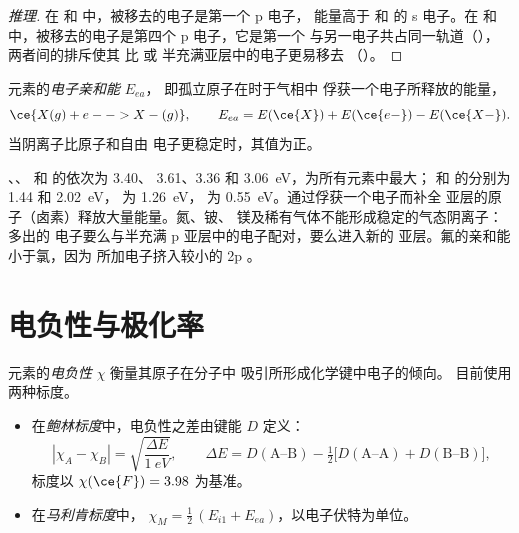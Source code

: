 \begin{proof}[推理]
在  和  中，被移去的电子是第一个 p 电子，
能量高于  和  的 s 电子。在 
和  中，被移去的电子是第四个 p 电子，它是第一个
与另一电子共占同一轨道（），两者间的排斥使其
比  或  半充满亚层中的电子更易移去
（）。
\end{proof}

\begin{definition}[电子亲和能]\label{def:b1:periodicity:electron-affinity}
元素的\emph{电子亲和能} $E_{ea}$，
即孤立原子在时于气相中
俘获一个电子所释放的能量，
\[
  \ce{X(g) + e- -> X-(g)}, \qquad E_{ea} = E(\ce{X}) + E(\ce{e-}) - E(\ce{X-}) .
\]
当阴离子比原子和自由
电子更稳定时，其值为正。
\end{definition}

\begin{example}[卤素及其近邻元素]\label{ex:b1:periodicity:ea}
、、 和  的依次为 3.40、
3.61、3.36 和 \qty{3.06}{eV}，为所有元素中最大； 和 
的分别为 1.44 和 \qty{2.02}{eV}， 为 \qty{1.26}{eV}，
 为 \qty{0.55}{eV}。通过俘获一个电子而补全
亚层的原子（卤素）释放大量能量。氮、铍、
镁及稀有气体不能形成稳定的气态阴离子：多出的
电子要么与半充满 p 亚层中的电子配对，要么进入新的
亚层。氟的亲和能小于氯，因为
所加电子挤入较小的 2p 。
\end{example}

\section{电负性与极化率}

\begin{definition}[电负性]\label{def:b1:periodicity:electronegativity}
元素的\emph{电负性} $\chi$ 衡量其原子在分子中
吸引所形成化学键中电子的倾向。
目前使用两种标度。
\begin{itemize}
  \item 在\emph{鲍林标度}中，电负性之差由键能
        $D$ 定义：
        \[
          |\chi_A - \chi_B| = \sqrt{\frac{\Delta E}{\qty{1}{eV}}}, \qquad
          \Delta E = D(\text{A--B}) - \tfrac12\big[D(\text{A--A}) +
          D(\text{B--B})\big],
        \]
        标度以 $\chi(\ce{F}) = 3.98$ 为基准。
  \item 在\emph{马利肯标度}中，
        $\chi_M = \tfrac12\,(E_{i1} + E_{ea})$，以电子伏特为单位。
\end{itemize}
\end{definition}

